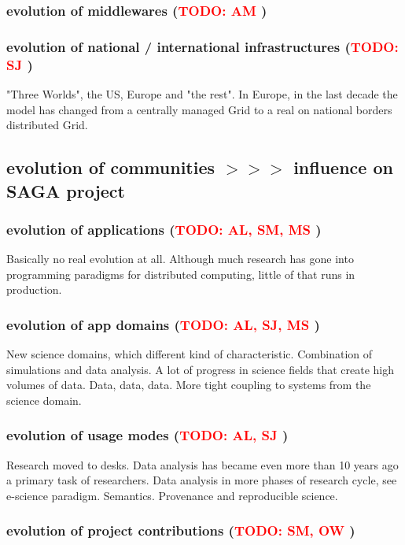 \documentclass{article}
\newcommand{\B}[1]{\textbf{#1}}
\newcommand{\nind}{\noindent}
\newcommand{\todo}[1]{{\textcolor{red}{\B{TODO:} #1 }}}
\begin{document}
 \subsubsection{ evolution of middlewares (\todo{AM})}
 \subsubsection{ evolution of national / international infrastructures (\todo{SJ})}

 "Three Worlds", the US, Europe and "the rest".  In Europe, in the
 last decade the model has changed from a centrally managed Grid to a
 real on national borders distributed Grid.\\

 
 \nind
 \subsection{ evolution of communities  $>>>$ influence on SAGA project}
 \subsubsection{ evolution of applications (\todo{AL, SM, MS})}
 
 Basically no real evolution at all. Although much research has gone
 into programming paradigms for distributed computing, little of that
 runs in production.
 
 \subsubsection{ evolution of app domains (\todo{AL, SJ, MS})}
 
 New science domains, which different kind of characteristic.
 Combination of simulations and data analysis. A lot of progress in
 science fields that create high volumes of data.  Data, data, data.
 More tight coupling to systems from the science domain.
 
 \subsubsection{ evolution of usage modes (\todo{AL, SJ})}
 
 Research moved to desks. Data analysis has became even more than 10
 years ago a primary task of researchers.  Data analysis in more
 phases of research cycle, see e-science paradigm.  Semantics.
 Provenance and reproducible science.
  
 \subsubsection{ evolution of project contributions (\todo{SM, OW})}
 
\end{document}
